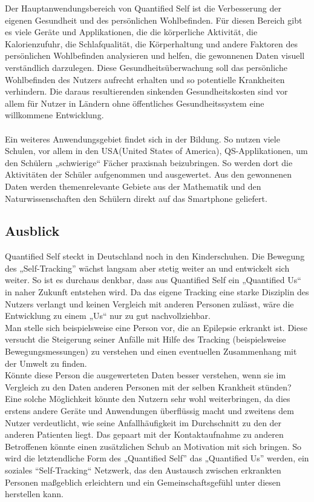 Der Hauptanwendungsbereich von Quantified Self ist die Verbesserung der eigenen Gesundheit und des persönlichen Wohlbefinden. 
Für diesen Bereich gibt es viele Geräte und Applikationen, die die körperliche Aktivität, die Kalorienzufuhr, die Schlafqualität, die Körperhaltung und andere Faktoren des persönlichen Wohlbefinden analysieren und helfen, die gewonnenen Daten visuell verständlich darzulegen. 
Diese Gesundheitsüberwachung soll das persönliche Wohlbefinden des Nutzers aufrecht erhalten und so potentielle Krankheiten verhindern.
Die daraus resultierenden sinkenden Gesundheitskosten sind vor allem für Nutzer in Ländern ohne öffentliches Gesundheitssystem eine willkommene Entwicklung.
\\
\\
Ein weiteres Anwendungsgebiet findet sich in der Bildung. 
So nutzen viele Schulen, vor allem in den USA(United States of America), QS-Applikationen, um den Schülern „schwierige“ Fächer praxisnah beizubringen. 
So werden dort die Aktivitäten der Schüler aufgenommen und ausgewertet.
Aus den gewonnenen Daten werden themenrelevante Gebiete aus der Mathematik und den Naturwissenschaften den Schülern direkt auf das Smartphone geliefert\cite{web:QSEducation}.

\subsection{Ausblick}
\label{ch:Grundlagen:sec:QuantifiedSelf:subsec:Ausblick}

Quantified Self steckt in Deutschland noch in den Kinderschuhen.
Die Bewegung des „Self-Tracking” wächst langsam aber stetig weiter an und entwickelt sich weiter.
So ist es durchaus denkbar, dass aus Quantified Self ein „Quantified Us“ in naher Zukunft entstehen wird.
Da das eigene Tracking eine starke Disziplin des Nutzers verlangt und keinen Vergleich mit anderen Personen zulässt, wäre die Entwicklung zu einem „Us“ nur zu gut nachvollziehbar.
\\
Man stelle sich beispielsweise eine Person vor, die an Epilepsie erkrankt ist. 
Diese versucht die Steigerung seiner Anfälle mit Hilfe des Tracking (beispielsweise Bewegungsmessungen) zu verstehen und einen eventuellen Zusammenhang mit der Umwelt zu finden. \\	
Könnte diese Person die ausgewerteten Daten besser verstehen, wenn sie im Vergleich zu den Daten anderen Personen mit der selben Krankheit stünden? \\
Eine solche Möglichkeit könnte den Nutzern sehr wohl weiterbringen, da dies erstens andere Geräte und Anwendungen überflüssig macht und zweitens dem Nutzer verdeutlicht, wie seine Anfallhäufigkeit im Durchschnitt zu den der anderen Patienten liegt.
Das gepaart mit der Kontaktaufnahme zu anderen Betroffenen könnte einen zusätzlichen Schub an Motivation mit sich bringen. 
So wird die letztendliche Form des „Quantified Self” das „Quantified Us” werden, ein soziales “Self-Tracking“ Netzwerk, das den Austausch zwischen erkrankten Personen maßgeblich erleichtern und ein Gemeinschaftsgefühl unter diesen herstellen kann.

